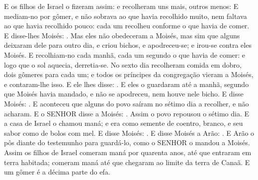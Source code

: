 {  E os filhos de Israel o fizeram assim: e recolheram uns mais, outros menos:
  E mediam-no por gômer, e não sobrava ao que havia recolhido muito, nem faltava ao que havia recolhido pouco: cada um recolheu conforme o que havia de comer.
  E disse-lhes Moisés: .
  Mas eles não obedeceram a Moisés, mas sim que alguns deixaram dele para outro dia, e criou bichos, e apodreceu-se; e irou-se contra eles Moisés.
  E recolhiam-no cada manhã, cada um segundo o que havia de comer: e logo que o sol aquecia, derretia-se.
  No sexto dia recolheram comida em dobro, dois gômeres para cada um; e todos os príncipes da congregação vieram a Moisés, e contaram-lhe isso.
  E ele lhes disse: .
  E eles o guardaram até a manhã, segundo que Moisés havia mandado, e não se apodreceu, nem houve nele bicho.
  E disse Moisés: .
  E aconteceu que alguns do povo saíram no sétimo dia a recolher, e não acharam.
  E o SENHOR disse a Moisés: .
  Assim o povo repousou o sétimo dia.
  E a casa de Israel o chamou maná; e era como semente de coentro, branco, e seu sabor como de bolos com mel.
  E disse Moisés: .
  E disse Moisés a Arão: .
  E Arão o pôs diante do testemunho para guardá-lo, como o SENHOR o mandou a Moisés.
  Assim os filhos de Israel comeram maná por quarenta anos, até que entraram em terra habitada; comeram maná até que chegaram ao limite da terra de Canaã.
  E um gômer é a décima parte do efa.
\par }

